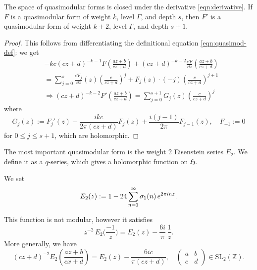 \begin{theorem}\label{thm:quasimod-der-closed}
The space of quasimodular forms is closed under the derivative \eqref{eqn:derivative}.
If $F$ is a quasimodular form of weight $k$, level $\Gamma$, and depth $s$, then $F'$ is a quasimodular form of weight $k + 2$, level $\Gamma$, and depth $s + 1$.
\end{theorem}
\begin{proof}
This follows from differentiating the definitional equation \eqref{eqn:quasimod-def}: we get
\begin{align}
    &-kc(cz + d)^{-k-1} F\left(\frac{az + b}{cz + d}\right) + (cz + d)^{-k-2} \frac{\dd F}{\dd z} \left(\frac{az + b}{cz + d}\right) \\
    &= \sum_{j=0}^{s} \frac{\dd F_j}{\dd z}(z)\left(\frac{c}{cz + d}\right)^j + F_j(z) \cdot (-j) \left(\frac{c}{cz + d}\right)^{j + 1} \\
    &\Rightarrow (cz + d)^{-k-2}F'\left(\frac{az + b}{cz + d}\right) = \sum_{j=0}^{s + 1} G_j(z) \left(\frac{c}{cz + d}\right)^j
\end{align}
where
\begin{equation}
    G_j(z) := F_j'(z) - \frac{ikc}{2\pi(cz + d)} F_j(z) + \frac{i(j-1)}{2\pi} F_{j-1}(z), \quad F_{-1} := 0
\end{equation}
for $0 \le j \le s + 1$, which are holomorphic.
\end{proof}

The most important quasimodular form is the weight 2 Eisenstein series $E_2$.
We define it as a $q$-series, which gives a holomorphic function on $\mathfrak{H}$.
\begin{definition}\label{def:E2} %
We set
\begin{equation}
    E_2(z):= 1-24\sum_{n=1}^\infty \sigma_1(n)\,e^{2\pi i n z}.\notag
\end{equation}
\end{definition}

\begin{lemma}\label{lemma:E2-transform}
This function is not modular, however it satisfies
\begin{equation}\label{eqn:E2-S-transform}
    z^{-2}\,E_2\Big(\frac{-1}{z}\Big)=E_2(z) -\frac{6i}{\pi}\, \frac{1}{z}.
\end{equation}
More generally, we have
\begin{equation}\label{eqn:E2-transform-general}
(cz + d)^{-2} E_2\left(\frac{az + b}{cx + d}\right) = E_2(z) - \frac{6ic}{\pi (cz + d)}, \quad \begin{pmatrix} a & b \\ c & d\end{pmatrix} \in \mathrm{SL}_{2}(\mathbb{Z}).
\end{equation}
\end{lemma}

